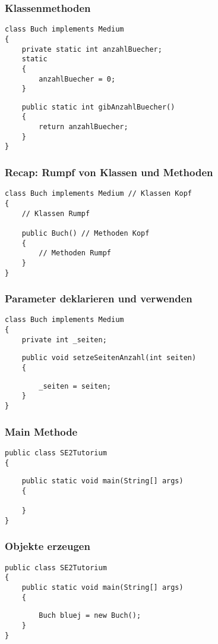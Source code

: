 \documentclass[mathserif]{beamer}
\begin{document}
\begin{frame}[fragile]
    \frametitle{Klassenmethoden}
    \begin{lstlisting}
class Buch implements Medium
{
    private static int anzahlBuecher;
    static
    {
        anzahlBuecher = 0;
    }
    \end{lstlisting}
    \pause
    \begin{lstlisting}
    public static int gibAnzahlBuecher()
    {
        return anzahlBuecher;
    }
}
    \end{lstlisting}
\end{frame}

\begin{frame}[fragile]
    \frametitle{Recap: Rumpf von Klassen und Methoden}
    \begin{lstlisting}
class Buch implements Medium // Klassen Kopf
{
    // Klassen Rumpf

    public Buch() // Methoden Kopf
    {
        // Methoden Rumpf
    }
}
    \end{lstlisting}
\end{frame}

\begin{frame}[fragile]
\frametitle{Parameter deklarieren und verwenden}
    \begin{lstlisting}
class Buch implements Medium
{
    private int _seiten;
    \end{lstlisting}
    \pause
    \begin{lstlisting}
    public void setzeSeitenAnzahl(int seiten)
    {
    \end{lstlisting}
    \pause
    \begin{lstlisting}
        _seiten = seiten;
    }
}
    \end{lstlisting}
\end{frame}

\begin{frame}[fragile]
    \frametitle{Main Methode}
    \begin{lstlisting}
public class SE2Tutorium
{
    \end{lstlisting}
    \pause
    \begin{lstlisting}
    public static void main(String[] args)
    {

    }
}
    \end{lstlisting}
\end{frame}

\begin{frame}[fragile]
\frametitle{Objekte erzeugen}
    \begin{lstlisting}
public class SE2Tutorium
{
    public static void main(String[] args)
    {
    \end{lstlisting}
    \pause
    \begin{lstlisting}
        Buch bluej = new Buch();
    }
}
    \end{lstlisting}
\end{frame}
\end{document}
